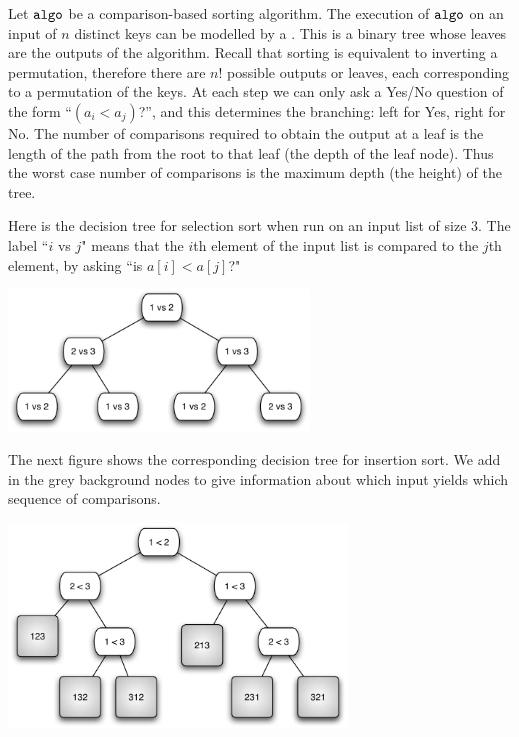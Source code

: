 Let $\operatorname{\text{\texttt{algo}}}$ be a comparison-based sorting algorithm. 
The execution of $\operatorname{\text{\texttt{algo}}}$ on an input of $n$ distinct keys can be modelled by a . 
This is a binary tree whose leaves are the outputs of the algorithm.
Recall that sorting is equivalent to inverting a permutation, therefore there are $n!$ possible outputs or leaves, each corresponding to a permutation of the keys.
At each step we can only ask a Yes/No question of the form ``$(a_i < a_j)$?'', and this determines the branching: 
left for Yes, right for No. 
The number of comparisons required to obtain the output at a leaf is the 
length of the path from the root to that leaf (the depth of the leaf node). 
Thus the worst case number of comparisons is the maximum depth (the height) of the tree.

\begin{Boxample}
Here is the decision tree for selection sort when run on an  input list of size $3$. The label 
``$i$ vs $j$" means that the $i$th element of the input list is compared to the $j$th element, by asking
``is $a[i] < a[j]$?"
\begin{center}
\includegraphics[width=8cm]{figs/selsort-dt}
\end{center}

The next figure shows the corresponding decision tree for insertion sort. 
We add in the grey background nodes to give information about 
which input yields which sequence of comparisons.
\begin{center}
\includegraphics[width=9cm]{figs/insort-dt}
\end{center} 
\end{Boxample}

